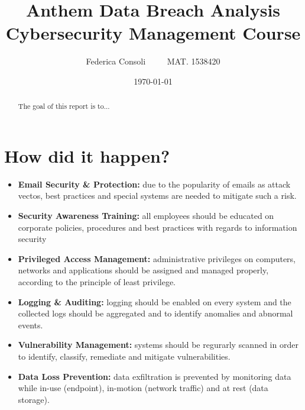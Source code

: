 \documentclass[a4paper]{article}
\title{%
	Anthem Data Breach Analysis\\
	\large Cybersecurity Management Course}
\author{Federica Consoli $\; \; \; \; \; \; \;$ MAT. 1538420}
\date{\today}
\begin{document}
	\maketitle
	\newpage
	\begin{abstract}
		The goal of this report is to...
	\end{abstract}

	\section{How did it happen?}
	
	\begin{itemize}
		\item \textbf{Email Security \& Protection:} due to the popularity of emails as attack vectos, best practices and special systems are needed to mitigate such a risk.
		\item \textbf{Security Awareness Training:} all employees should be educated on corporate policies, procedures and best practices with regards to information security
		\item \textbf{Privileged Access Management:} administrative privileges on computers, networks and applications should be assigned and managed properly, according to the principle of least privilege.
		\item \textbf{Logging \& Auditing:} logging should be enabled on every system and the collected logs should be aggregated and to identify anomalies and abnormal events.
		\item \textbf{Vulnerability Management:} systems should be regurarly scanned in order to identify, classify, remediate and mitigate vulnerabilities.
		\item \textbf{Data Loss Prevention:} data exfiltration is prevented by monitoring data while in-use (endpoint), in-motion (network traffic) and at rest (data storage).
		
	\end{itemize}
\end{document}

